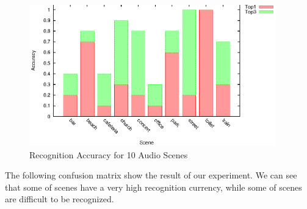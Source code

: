\begin{table}[htbp]
\centering
{}
\caption{Recognition Accuracy for 10 Audio Scenes}
\label{table:ac}
\end{table}
\begin{figure}[!htbp]
\centering
\includegraphics[width=0.95\textwidth]{figures/comp.eps}
\caption{Recognition Accuracy for 10 Audio Scenes}
\label{fig:ac}
\end{figure}

The following confusion matrix show the result of our experiment. We can see that some of scenes have a very high recognition currency, while some of scenes are difficult to be recognized.


